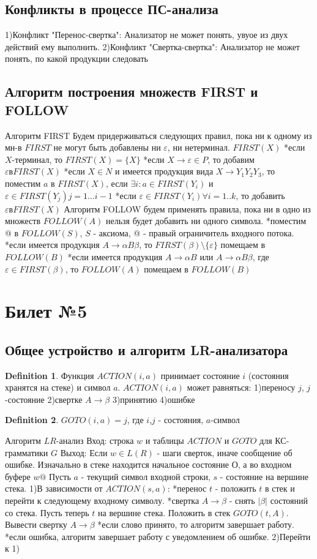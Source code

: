 \documentclass[a4paper]{article}
\theoremstyle{plain}
\theoremstyle{remark}
\theoremstyle{definition}
\newtheorem*{definition-star}{Definition}
\begin{document}
{\subsection{Конфликты в процессе ПС-анализа}
1)Конфликт "Перенос-свертка":
Анализатор не может понять, увуое из двух действий ему выполнить.
2)Конфликт "Свертка-свертка":
Анализатор не может понять, по какой продукции следовать
\subsection{Алгоритм построения множеств FIRST и FOLLOW}
Алгоритм FIRST
Будем придерживаться следующих правил, пока ни к одному из мн-в $FIRST$ не могут быть добавлены ни $\varepsilon$, ни нетерминал.
$FIRST(X)$
*если $X$-терминал, то $FIRST(X)=\{X\}$
*если $X\rightarrow\varepsilon\in P$, то добавим $\varepsilon в FIRST(X)$
*если $X\in N$ и имеется продукция вида $X\rightarrow Y_1Y_2Y_3$, то поместим $a$ в $FIRST(X)$, если $\exists i: a \in FIRST(Y_i)$ и $\varepsilon \in FIRST(Y_j) j=1...i-1$
*если $\varepsilon \in FIRST(Y_i) \forall i=1..k$, то добавить $\varepsilon в FIRST(X)$
Алгоритм FOLLOW
будем применять правила, пока ни в одно из множеств $FOLLOW(A)$ нельзя будет добавить ни одного символа.
*поместим @ в $FOLLOW(S)$, $S$ - аксиома, @ - правый ограничитель входного потока.
*если имеется продукция $A\rightarrow\alpha B\beta$, то $FIRST(\beta)\setminus\{\varepsilon\}$ помещаем в $FOLLOW(B)$
*если имеется продукция $A\rightarrow\alpha B$ или $A\rightarrow\alpha B\beta$, где$\varepsilon \in FIRST(\beta)$, то $FOLLOW(A)$ помещаем в $FOLLOW(B)$
\section{Билет №5}
\subsection{Общее устройство и алгоритм LR-анализатора}
\begin{definition-star}Функция $ACTION(i,a)$ принимает состояние $i$ (состояния хранятся на стеке) и символ $a$.
$ACTION(i,a)$ может равняться:
1)переносу $j$, $j$-состояние
2)свертке $A\rightarrow\beta$
3)принятию
4)ошибке
\end{definition-star}
\begin{definition-star}$GOTO(i,a)=j$, где $i$,$j$ - состояния, $a$-символ
\end{definition-star}
Алгоритм $LR$-анализ
Вход: строка $w$ и таблицы $ACTION$ и $GOTO$ для КС-грамматики $G$
Выход: Если $w\in L(R)$ - шаги сверток, иначе сообщение об ошибке.
Изначально в стеке находится начальное состояние $О$, а во входном буфере $w@$
Пусть $a$ - текущий символ входной строки, $s$ - состояние на вершине стека.
1)В зависимости от $ACTION(s,a)$:
*перенос $t$ - положить $t$ в стек и перейти к следующему входному символу.
*свертка $A\rightarrow\beta$ - снять $|\beta|$ состояний со стека. Пусть теперь $t$ на вершине стека. Положить в стек $GOTO(t,A)$. Вывести свертку $A\rightarrow\beta$
*если слово принято, то алгоритм завершает работу.
*если ошибка, алгоритм завершает работу с уведомлением об ошибке.
2)Перейти к 1)
}
\end{document}
